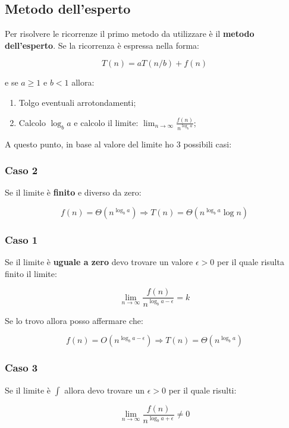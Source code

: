 \subsection{Metodo dell'esperto}

Per risolvere le ricorrenze il primo metodo da utilizzare è il \textbf{metodo dell'esperto}. Se la ricorrenza è espressa nella forma:

$$T(n)=aT(n/b)+f(n)$$

e se $a \ge 1$ e $b<1$ allora:

\begin{enumerate}

\item Tolgo eventuali arrotondamenti;
\item Calcolo $\log_ba$ e calcolo il limite: $\lim_{n \to \infty}\frac{f(n)}{n^{\log_ba}}$;

\end{enumerate}

A questo punto, in base al valore del limite ho 3 possibili casi:

\subsubsection{Caso 2}

Se il limite è \textbf{finito} e diverso da zero:

$$f(n)=\Theta(n^{\log_ba})\Rightarrow T(n)=\Theta(n^{\log_ba}\log n)$$

\subsubsection{Caso 1}

Se il limite è \textbf{uguale a zero} devo trovare un valore $\epsilon > 0$ per il quale risulta finito il limite:

$$\lim_{n \to \infty}\frac{f(n)}{n^{\log_ba-\epsilon}}=k$$

Se lo trovo allora posso affermare che:

$$f(n)=O(n^{\log_ba-\epsilon}) \Rightarrow T(n)=\Theta(n^{\log_ba})$$

\subsubsection{Caso 3}

Se il limite è $\int$ allora devo trovare un $\epsilon >0$ per il quale risulti:

$$\lim_{n \to \infty}\frac{f(n)}{n^{\log_ba+\epsilon}}\neq 0$$

